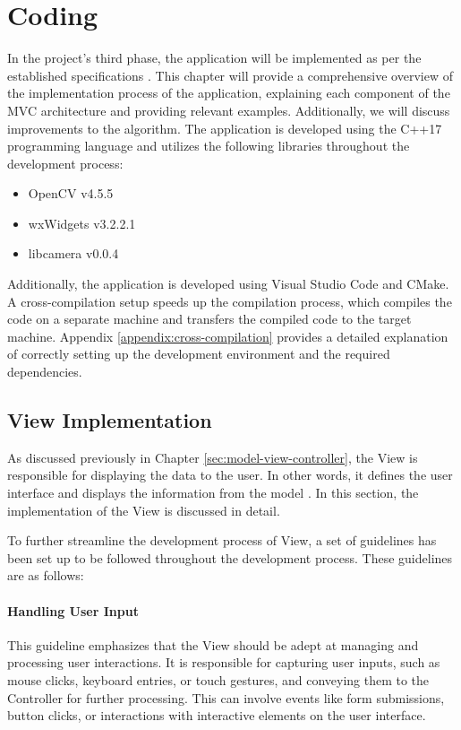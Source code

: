 \chapter{Coding}
\label{chapter:coding}

In the project's third phase, the application will be implemented as per the established specifications \cite{Hausen}. This chapter will provide a comprehensive overview of the implementation process of the application, explaining each component of the MVC architecture and providing relevant examples. Additionally, we will discuss improvements to the algorithm. The application is developed using the C++17 programming language and utilizes the following libraries throughout the development process:

\begin{itemize}
    \item OpenCV v4.5.5
    \item wxWidgets v3.2.2.1
    \item libcamera v0.0.4
\end{itemize}

Additionally, the application is developed using Visual Studio Code and CMake. A cross-compilation setup speeds up the compilation process, which compiles the code on a separate machine and transfers the compiled code to the target machine. Appendix \ref{appendix:cross-compilation} provides a detailed explanation of correctly setting up the development environment and the required dependencies.

\section{View Implementation}
As discussed previously in Chapter \ref{sec:model-view-controller}, the View is responsible for displaying the data to the user. In other words,  it defines the user interface and displays the information from the model \cite{Krastev20}. In this section, the implementation of the View is discussed in detail.

To further streamline the development process of View,  a set of guidelines has been set up to be followed throughout the development process. These guidelines are as follows:

\subsubsection{Handling User Input}
This guideline emphasizes that the View should be adept at managing and processing user interactions. It is responsible for capturing user inputs, such as mouse clicks, keyboard entries, or touch gestures, and conveying them to the Controller for further processing. This can involve events like form submissions, button clicks, or interactions with interactive elements on the user interface.

